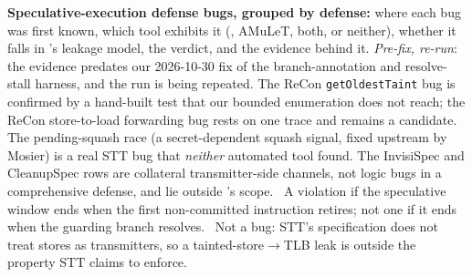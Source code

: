 \textbf{Speculative-execution defense bugs, grouped by defense:} where each bug was first known, which tool exhibits it (\toolname{}, AMuLeT, both, or neither), whether it falls in \toolname{}'s leakage model, the verdict, and the evidence behind it. \emph{Pre-fix, re-run}: the evidence predates our 2026-10-30 fix of the branch-annotation and resolve-stall harness, and the run is being repeated. The ReCon \texttt{getOldestTaint} bug is confirmed by a hand-built test that our bounded enumeration does not reach; the ReCon store-to-load forwarding bug rests on one trace and remains a candidate. The pending-squash race (a secret-dependent squash signal, fixed upstream by Mosier) is a real STT bug that \emph{neither} automated tool found. The InvisiSpec and CleanupSpec rows are collateral transmitter-side channels, not logic bugs in a comprehensive defense, and lie outside \toolname{}'s scope. \textdagger\ A violation if the speculative window ends when the first non-committed instruction retires; not one if it ends when the guarding branch resolves. \textdaggerdbl\ Not a bug: STT's specification does not treat stores as transmitters, so a tainted-store$\to$TLB leak is outside the property STT claims to enforce.
